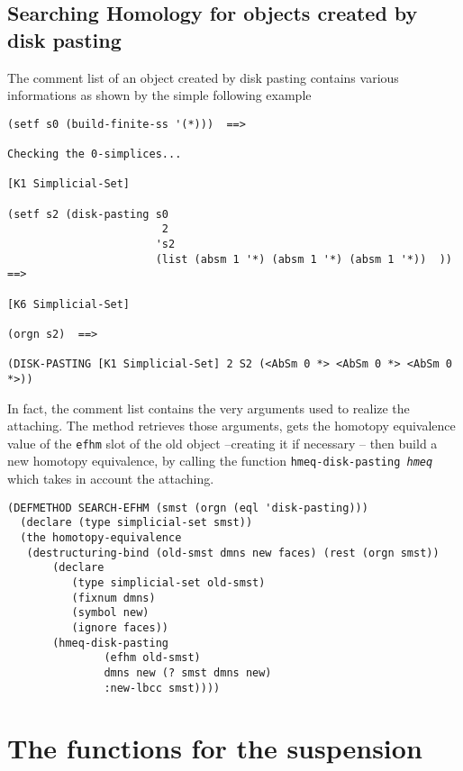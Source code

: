 \subsection {Searching Homology for objects created by disk pasting}

The comment list of an object created by disk pasting
contains various informations as shown by the simple following example
{\footnotesize\begin{verbatim}
(setf s0 (build-finite-ss '(*)))  ==>

Checking the 0-simplices...

[K1 Simplicial-Set]

(setf s2 (disk-pasting s0
                        2
                       's2
                       (list (absm 1 '*) (absm 1 '*) (absm 1 '*))  ))  ==>

[K6 Simplicial-Set]

(orgn s2)  ==>

(DISK-PASTING [K1 Simplicial-Set] 2 S2 (<AbSm 0 *> <AbSm 0 *> <AbSm 0 *>))
\end{verbatim}}
In fact, the comment list contains the very arguments used to realize the attaching.
The method retrieves those arguments, gets the homotopy equivalence value of the
{\tt efhm} slot of the old object --creating it if necessary -- then build
a new homotopy equivalence, by calling the function {\tt hmeq-disk-pasting {\em hmeq}} which
takes in account the attaching.
{\footnotesize\begin{verbatim}
(DEFMETHOD SEARCH-EFHM (smst (orgn (eql 'disk-pasting)))
  (declare (type simplicial-set smst))
  (the homotopy-equivalence
   (destructuring-bind (old-smst dmns new faces) (rest (orgn smst))
       (declare
          (type simplicial-set old-smst)
          (fixnum dmns)
          (symbol new)
          (ignore faces))
       (hmeq-disk-pasting
               (efhm old-smst)
               dmns new (? smst dmns new)
               :new-lbcc smst))))
\end{verbatim}}
\newpage

\section {The functions for the suspension}

